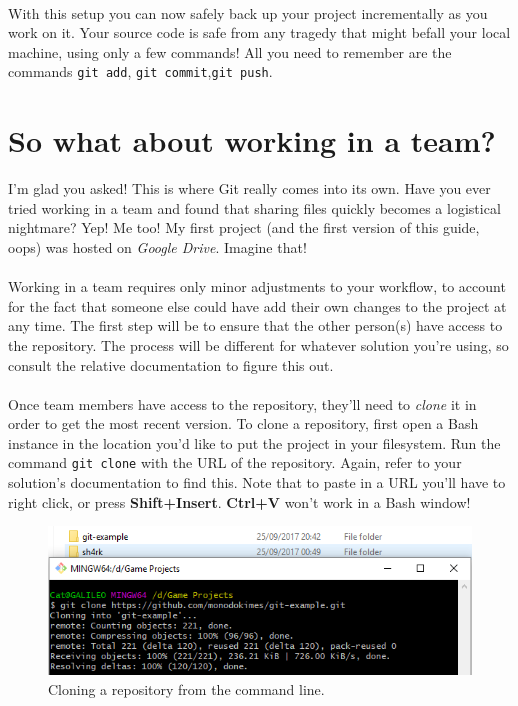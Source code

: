 \documentclass{article}
\begin{document}
\paragraph{}
With this setup you can now safely back up your project incrementally as you work on it. Your source code is safe from any tragedy that might befall your local machine, using only a few commands! All you need to remember are the commands \texttt{git add}, \texttt{git commit},\texttt{git push}.

\section{So what about working in a team?}
I'm glad you asked! This is where Git really comes into its own. Have you ever tried working in a team and found that sharing files quickly becomes a logistical nightmare? Yep! Me too! My first project (and the first version of this guide, oops) was hosted on \textit{Google Drive}. Imagine that!

\paragraph{}
Working in a team requires only minor adjustments to your workflow, to account for the fact that someone else could have add their own changes to the project at any time. The first step will be to ensure that the other person(s) have access to the repository. The process will be different for whatever solution you're using, so consult the relative documentation to figure this out.

\paragraph{}
Once team members have access to the repository, they'll need to \textit{clone} it in order to get the most recent version. To clone a repository, first open a Bash instance in the location you'd like to put the project in your filesystem. Run the command \texttt{git clone} with the URL of the repository. Again, refer to your solution's documentation to find this. Note that to paste in a URL you'll have to right click, or press \textbf{Shift+Insert}. \textbf{Ctrl+V} won't work in a Bash window!

\begin{figure}
    \includegraphics[width=\linewidth]{images/clone.png}
    \caption{Cloning a repository from the command line.}
    \label{fig:clone}
\end{figure}
\end{document}
